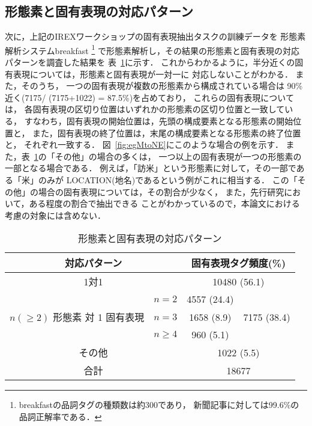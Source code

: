\subsection{形態素と固有表現の対応パターン}


次に，上記のIREXワークショップの固有表現抽出タスクの訓練データを
形態素解析システム{\sc breakfast}\cite{Sassano97aj}
\footnote{
  {\sc breakfast}の品詞タグの種類数は約300であり，
  新聞記事に対しては99.6\%の品詞正解率である．
}
で形態素解析し，その結果の形態素と固有表現の対応パターンを調査した結果を
表~\ref{tab:MnNE}に示す．
これからわかるように，半分近くの固有表現については，形態素と固有表現が一対一に
対応しないことがわかる．
また，そのうち，
	一つの固有表現が複数の形態素から構成されている場合は
	90\%近く(7175/ (7175+1022) = 87.5\%)を占めており，
	これらの固有表現については，
	各固有表現の区切り位置はいずれかの形態素の区切り位置と一致している，
	すなわち，固有表現の開始位置は，先頭の構成要素となる形態素の開始位置と，
	また，固有表現の終了位置は，末尾の構成要素となる形態素の終了位置と，
	それぞれ一致する．
図~\ref{fig:egMtoNE}にこのような場合の例を示す．
また，表~\ref{tab:MnNE}の「その他」の場合の多くは，
一つ以上の固有表現が一つの形態素の一部となる場合である．
例えば，「訪米」という形態素に対して，その一部である「米」のみが
LOCATION(地名)であるという例がこれに相当する．
この「その他」の場合の固有表現については，その割合が少なく，
また，先行研究\cite{Uchimoto00aj}において，ある程度の割合で抽出できる
ことがわかっているので，本論文における考慮の対象には含めない．


\begin{table}
\begin{center}
\caption{形態素と固有表現の対応パターン}
\label{tab:MnNE}
\begin{tabular}{|c|c||c|c|} \hline
\multicolumn{2}{|c||}{対応パターン} 
        & \multicolumn{2}{|c|}{固有表現タグ頻度(\%)} \\ \hline\hline
\multicolumn{2}{|c||}{1対1} 
        & \multicolumn{2}{|c|}{10480 (56.1)} \\ \hline
         & $n=2$ & 4557 (24.4) & \\ \cline{2-3}
$n (\geq 2)$ 形態素 対 1 固有表現   &   $n=3$ & 1658 (8.9) 
                                      & 7175  (38.4) \\ \cline{2-3}
          & $n\geq 4$ & 960 (5.1) & \\ \hline
\multicolumn{2}{|c||}{その他} &   
                \multicolumn{2}{|c|}{1022 (5.5)} \\ \hline\hline
\multicolumn{2}{|c||}{合計} &   \multicolumn{2}{|c|}{18677} \\ \hline
\end{tabular}
\end{center}
\end{table}

